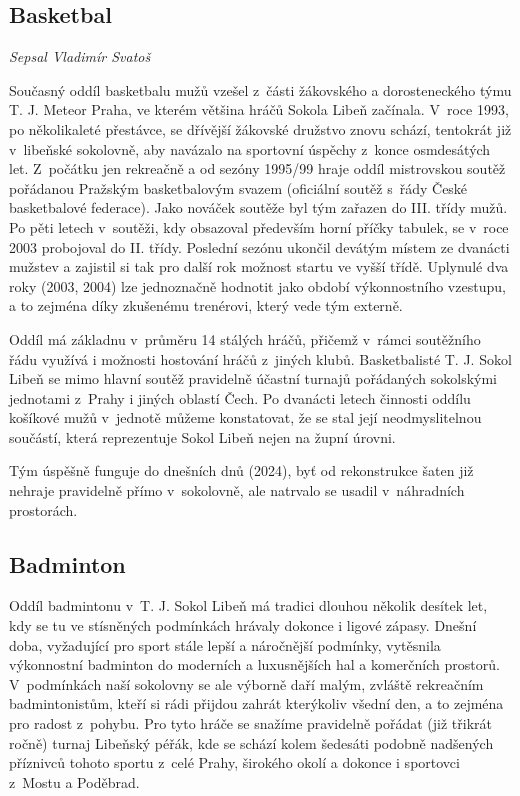 \documentclass[a5paper, 12pt, twoside]{article}
\begin{document}
\subsection{Basketbal}

\textit{Sepsal Vladimír Svatoš}

Současný oddíl basketbalu mužů vzešel z~části žákovského a
dorosteneckého týmu T. J. Meteor Praha, ve kterém většina hráčů Sokola
Libeň začínala. V~roce 1993, po několikaleté přestávce, se dřívější
žákovské družstvo znovu schází, tentokrát již v~libeňské sokolovně, aby
navázalo na sportovní úspěchy z~konce osmdesátých let. Z~počátku jen
rekreačně a od sezóny 1995/99 hraje oddíl mistrovskou soutěž pořádanou
Pražským basketbalovým svazem (oficiální soutěž s~řády České
basketbalové federace). Jako nováček soutěže byl tým zařazen do III.
třídy mužů. Po pěti letech v~soutěži, kdy obsazoval především horní
příčky tabulek, se v~roce 2003 probojoval do II. třídy. Poslední sezónu
ukončil devátým místem ze dvanácti mužstev a zajistil si tak pro další
rok možnost startu ve vyšší třídě. Uplynulé dva roky (2003, 2004) lze
jednoznačně hodnotit jako období výkonnostního vzestupu, a to zejména
díky zkušenému trenérovi, který vede tým externě.

Oddíl má základnu v~průměru 14 stálých hráčů, přičemž v~rámci soutěžního
řádu využívá i možnosti hostování hráčů z~jiných klubů. Basketbalisté T.
J. Sokol Libeň se mimo hlavní soutěž pravidelně účastní turnajů
pořádaných sokolskými jednotami z~Prahy i jiných oblastí Čech. Po
dvanácti letech činnosti oddílu košíkové mužů v~jednotě můžeme
konstatovat, že se stal její neodmyslitelnou součástí, která
reprezentuje Sokol Libeň nejen na župní úrovni.

Tým úspěšně funguje do dnešních dnů (2024), byť od rekonstrukce šaten
již nehraje pravidelně přímo v~sokolovně, ale natrvalo se usadil
v~náhradních prostorách.

\subsection{Badminton}

Oddíl badmintonu v~T. J. Sokol Libeň má tradici dlouhou několik desítek
let, kdy se tu ve stísněných podmínkách hrávaly dokonce i ligové zápasy.
Dnešní doba, vyžadující pro sport stále lepší a náročnější podmínky,
vytěsnila výkonnostní badminton do moderních a luxusnějších hal a
komerčních prostorů. V~podmínkách naší sokolovny se ale výborně daří
malým, zvláště rekreačním badmintonistům, kteří si rádi přijdou zahrát
kterýkoliv všední den, a to zejména pro radost z~pohybu. Pro tyto hráče
se snažíme pravidelně pořádat (již třikrát ročně) turnaj Libeňský péřák,
kde se schází kolem šedesáti podobně nadšených příznivců tohoto sportu
z~celé Prahy, širokého okolí a dokonce i sportovci z~Mostu a Poděbrad.
\end{document}

